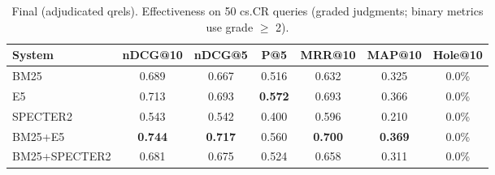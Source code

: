 \begin{table}[t]
\centering
\small
\caption{Final (adjudicated qrels). Effectiveness on 50 cs.CR queries (graded judgments; binary metrics use grade $\geq$ 2).}
\label{tab:main}
\begin{tabular}{lcccccc}
\toprule
System & nDCG@10 & nDCG@5 & P@5 & MRR@10 & MAP@10 & Hole@10 \\
\midrule
BM25 & 0.689 & 0.667 & 0.516 & 0.632 & 0.325 & 0.0\% \\
E5 & 0.713 & 0.693 & \textbf{0.572} & 0.693 & 0.366 & 0.0\% \\
SPECTER2 & 0.543 & 0.542 & 0.400 & 0.596 & 0.210 & 0.0\% \\
BM25+E5 & \textbf{0.744} & \textbf{0.717} & 0.560 & \textbf{0.700} & \textbf{0.369} & 0.0\% \\
BM25+SPECTER2 & 0.681 & 0.675 & 0.524 & 0.658 & 0.311 & 0.0\% \\
\bottomrule
\end{tabular}
\end{table}
